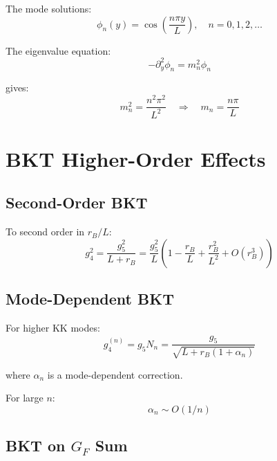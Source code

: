 \documentclass[11pt,a4paper]{article}
\begin{document}
The mode solutions:
\begin{equation}
\label{eq:mode-solutions}
\phi_n(y) = \cos\left(\frac{n\pi y}{L}\right), \quad n = 0, 1, 2, \ldots
\end{equation}

The eigenvalue equation:
\begin{equation}
\label{eq:eigenvalue}
-\partial_y^2 \phi_n = m_n^2 \phi_n
\end{equation}

gives:
\begin{equation}
\label{eq:mn-from-eigen}
m_n^2 = \frac{n^2 \pi^2}{L^2} \quad \Rightarrow \quad m_n = \frac{n\pi}{L}
\end{equation}

\section{BKT Higher-Order Effects}
\label{app:bkt-higher}

\subsection{Second-Order BKT}
\label{app:bkt-second}

To second order in $r_B/L$:
\begin{equation}
\label{eq:bkt-second-order}
g_4^2 = \frac{g_5^2}{L + r_B} = \frac{g_5^2}{L} \left(1 - \frac{r_B}{L} + \frac{r_B^2}{L^2} + O(r_B^3)\right)
\end{equation}

\subsection{Mode-Dependent BKT}
\label{app:bkt-mode-dep}

For higher KK modes:
\begin{equation}
\label{eq:bkt-mode-n}
g_4^{(n)} = g_5 N_n = \frac{g_5}{\sqrt{L + r_B (1 + \alpha_n)}}
\end{equation}

where $\alpha_n$ is a mode-dependent correction.

For large $n$:
\begin{equation}
\label{eq:bkt-large-n}
\alpha_n \sim O(1/n)
\end{equation}

\subsection{BKT on $G_F$ Sum}
\label{app:bkt-gf-sum}
\end{document}

